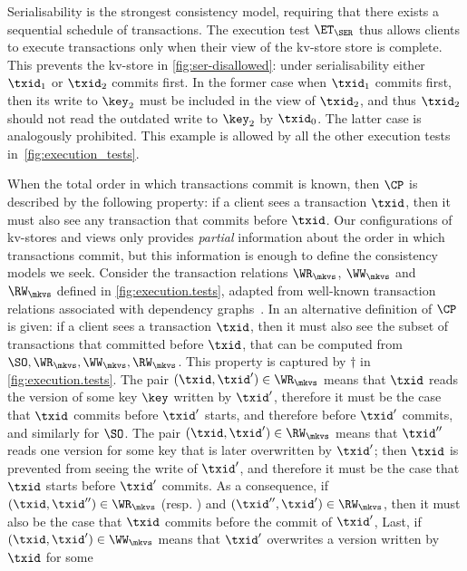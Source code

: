 Serialisability is the strongest consistency model, requiring that there exists a sequential schedule of transactions. 
The execution test $\ET_{\SER}$ thus allows clients to execute transactions only when 
their view of the kv-store store is complete.
This prevents the kv-store in  \cref{fig:ser-disallowed}: under serialisability either $\txid_1$ or $\txid_2$ commits first.
In the former case when $\txid_1$ commits first, then its write to $\key_2$ must be included in the view of $\txid_2$, and thus $\txid_2$ should not read the outdated write to $\key_2$ by $\txid_0$. 
The latter case is analogously prohibited. 
This example is allowed by all the other execution tests in~\cref{fig:execution_tests}.

\label{para:cp}
When the total order in which transactions commit is known, then 
$\CP$ is described by the following property: 
if a client sees a transaction $\txid$,
then it must also see any transaction that commits before $\txid$. 
Our configurations of kv-stores and views only provides {\em
  partial} information about the order in which transactions commit,
but this information is enough to define the consistency models we
seek. 
Consider the transaction relations $\WR_{\mkvs}$, $\WW_{\mkvs}$ and
$\RW_{\mkvs}$ defined in \ref{fig:execution.tests}, adapted from well-known
transaction relations associated with dependency graphs~\cite{adya-icde,adya}.
In \cite{laws} an alternative definition of $\CP$ is given: if a client sees a transaction $\txid$, 
then it must also see the subset of transactions that committed before $\txid$, that can 
be computed from $\SO, \WR_{\mkvs}, \WW_{\mkvs}, \RW_{\mkvs}$. This property is captured 
by $\dagger$ in \cref{fig:execution.tests}.
The pair $(\txid,\txid') \in \WR_\mkvs$ means that $\txid$ reads the version of some key $\key$ 
written by $\txid'$, therefore  it {must} be
the case that $\txid$ commits before $\txid'$ starts, and therefore before $\txid'$ commits,
and similarly for $\SO$.
The pair $(\txid, \txid') \in \RW_{\mkvs}$ means that $\txid''$ reads one version for some key that 
is later overwritten by $\txid'$; then $\txid$ is prevented from seeing the write of $\txid'$, 
and therefore it {must} be the case that $\txid$ starts before 
$\txid'$ commits. 
As a consequence, if 
$(\txid,\txid'') \in \WR_{\mkvs}$ (resp. \SO) and $(\txid'',\txid') \in \RW_\mkvs$, then it {must} also be the case that $\txid$ commits before the commit  of $\txid'$, 
Last, if $(\txid,\txid') \in \WW_\mkvs$ means that $\txid'$ overwrites a version written by $\txid$ for some 
